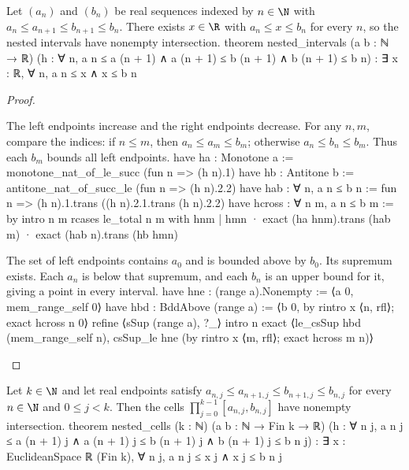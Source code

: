 \begin{lemma} \label{an1:lem:nested-intervals}
  \begin{lean}{Let $(a_n)$ and $(b_n)$ be real sequences indexed by $n\in\N$ with $a_n\leq a_{n+1}\leq b_{n+1}\leq b_n$. There exists $x\in\R$ with $a_n\leq x\leq b_n$ for every $n$, so the nested intervals have nonempty intersection.}
    theorem nested_intervals (a b : ℕ → ℝ)
        (h : ∀ n, a n ≤ a (n + 1) ∧ a (n + 1) ≤ b (n + 1) ∧ b (n + 1) ≤ b n) :
        ∃ x : ℝ, ∀ n, a n ≤ x ∧ x ≤ b n
  \end{lean}
\end{lemma}

\begin{proof}
  \begin{lean}{The left endpoints increase and the right endpoints decrease. For any $n,m$, compare the indices: if $n\leq m$, then $a_n\leq a_m\leq b_m$; otherwise $a_n\leq b_n\leq b_m$. Thus each $b_m$ bounds all left endpoints.}
    have ha : Monotone a := monotone_nat_of_le_succ (fun n => (h n).1)
    have hb : Antitone b := antitone_nat_of_succ_le (fun n => (h n).2.2)
    have hab : ∀ n, a n ≤ b n := fun n => (h n).1.trans ((h n).2.1.trans (h n).2.2)
    have hcross : ∀ n m, a n ≤ b m := by
      intro n m
      rcases le_total n m with hnm | hmn
      · exact (ha hnm).trans (hab m)
      · exact (hab n).trans (hb hmn)
  \end{lean}

  \begin{lean}{The set of left endpoints contains $a_0$ and is bounded above by $b_0$. Its supremum exists. Each $a_n$ is below that supremum, and each $b_n$ is an upper bound for it, giving a point in every interval.}
    have hne : (range a).Nonempty := ⟨a 0, mem_range_self 0⟩
    have hbd : BddAbove (range a) := ⟨b 0, by rintro x ⟨n, rfl⟩; exact hcross n 0⟩
    refine ⟨sSup (range a), ?_⟩
    intro n
    exact ⟨le_csSup hbd (mem_range_self n), csSup_le hne (by rintro x ⟨m, rfl⟩; exact hcross m n)⟩
  \end{lean}

\end{proof}

\begin{theorem} \label{an1:thm:nested-k-cells}
  \begin{lean}{Let $k\in\N$ and let real endpoints satisfy $a_{n,j}\leq a_{n+1,j}\leq b_{n+1,j}\leq b_{n,j}$ for every $n\in\N$ and $0\leq j<k$. Then the cells $\prod_{j=0}^{k-1}[a_{n,j},b_{n,j}]$ have nonempty intersection.}
    theorem nested_cells (k : ℕ) (a b : ℕ → Fin k → ℝ)
        (h : ∀ n j, a n j ≤ a (n + 1) j ∧
          a (n + 1) j ≤ b (n + 1) j ∧ b (n + 1) j ≤ b n j) :
        ∃ x : EuclideanSpace ℝ (Fin k), ∀ n j, a n j ≤ x j ∧ x j ≤ b n j
  \end{lean}
\end{theorem}

